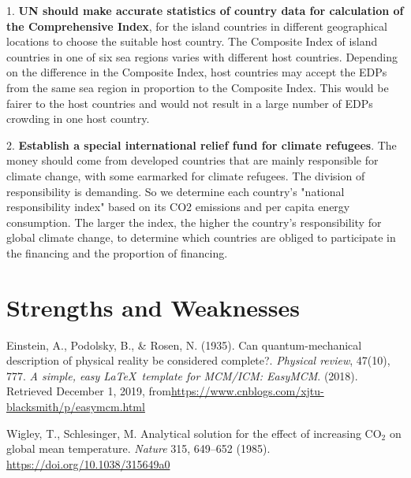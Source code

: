 \documentclass[12pt]{article}  %
\begin{document}
1. \textbf{UN should make accurate statistics of country data for calculation of the Comprehensive Index}, for the island countries in different geographical locations to choose the suitable host country. The Composite Index of island countries in one of six sea regions varies with different host countries. Depending on the difference in the Composite Index, host countries may accept the EDPs from the same sea region in proportion to the Composite Index. This would be fairer to the host countries and would not result in a large number of EDPs crowding in one host country.




2. \textbf{Establish a special international relief fund for climate refugees}. The money should come from developed countries that are mainly responsible for climate change, with some earmarked for climate refugees. The division of responsibility is demanding. So we determine each country's "national responsibility index" based on its CO2 emissions and per capita energy consumption. The larger the index, the higher the country's responsibility for global climate change, to determine which countries are obliged to participate in the financing and the proportion of financing.






\section{Strengths and Weaknesses}






\begin{thebibliography}{99}
 Einstein, A., Podolsky, B., \& Rosen, N. (1935). Can quantum-mechanical description of physical reality be considered complete?. \emph{Physical review}, 47(10), 777.
 \emph{A simple, easy \LaTeX\ template for MCM/ICM: EasyMCM}. (2018). Retrieved December 1, 2019, from\url{https://www.cnblogs.com/xjtu-blacksmith/p/easymcm.html}


 Wigley, T., Schlesinger, M. Analytical solution for the effect of increasing CO$_2$ on global mean temperature. \emph{Nature} 315, 649–652 (1985). \url{https://doi.org/10.1038/315649a0}





\end{thebibliography}
\end{document}
